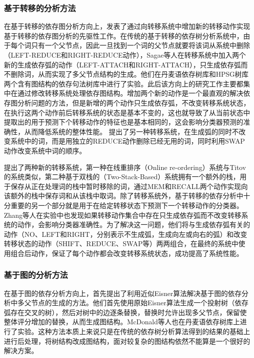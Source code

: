 \subsubsection{基于转移的分析方法}

在基于转移的依存图分析方向上，发表了通过向转移系统中增加新的转移动作实现基于转移的依存图分析的先驱性工作。在传统的基于转移的依存树分析系统中，由于每个词只有一个父节点，因此一旦找到一个词的父节点就要将该词从系统中删除（LEFT-REDUCE和RIGHT-REDUCE动作），Sagae等人在转移系统中加入两个新的生成依存弧的动作（LEFT-ATTACH和RIGHT-ATTACH），只生成依存弧而不删除词，从而实现了多父节点结构的生成。他们在丹麦语依存树库和HPSG树库两个含有图结构的依存句法树库中进行了实验。此后该方向上的研究工作主要都集中在通过修改转移系统处理依存图结构。增加两个新的动作是一个最直观的解决依存图分析问题的方法，但是新增的两个动作只生成依存弧，不改变转移系统状态，在执行这两个动作前后转移系统的状态是基本不变的，这也就导致了从当前状态中提取出的用于预测下个转移动作的特征也是基本相同的，这会影响分类器预测的准确性，从而降低系统的整体性能。
提出了另一种转移系统，在生成弧的同时不改变系统中的词，而是用独立的REDUCE动作删除已经无用的词，同时利用SWAP动作改变系统中词的顺序。

 提出了两种新的转移系统，第一种在线重排序（Online re-ordering）系统与Titov的系统类似，第二种基于双栈的（Two-Stack-Based）系统拥有一个额外的栈，用于保存从正在处理词的栈中暂时移除的词，通过MEM和RECALL两个动作实现向该额外的栈中保存词和从该栈中取词。除了转移系统外，基于转移的依存分析中十分重要的另一个部分就是用于在给定转移状态下预测下一个转移动作的分类器。Zhang等人在实验中也发现如果转移动作集合中存在只生成依存弧而不改变转移系统的动作，会影响分类器准确性。为了解决这一问题，他们将与生成依存弧有关的动作（NO、LEFT和RIGHT，分别表示不生成弧，生成向左或向右的弧）和改变转移状态的动作（SHIFT、REDUCE、SWAP等）两两组合，在最终的系统中使用组合后动作，保证了每个动作都会改变转移系统状态，成功提高了系统性能。

\subsubsection{基于图的分析方法}

在基于图的依存分析方向上，首先提出了利用近似Eisner算法解决基于图的依存分析中多父节点的生成的方法。他们首先使用原始Eisner算法生成一个投射树（依存弧存在交叉的树），然后对树中的边逐条替换，替换时允许出现多父节点，保留使整体评分增加的替换，从而生成图结构。McDonald等人也在丹麦语依存树库上进行了实验。这种方法本质上来说只是在传统的依存树分析算法得到的结果的基础上进行后处理，将树结构改成图结构，面对较复杂的图结构依然不能算是一个很好的解决方案。

